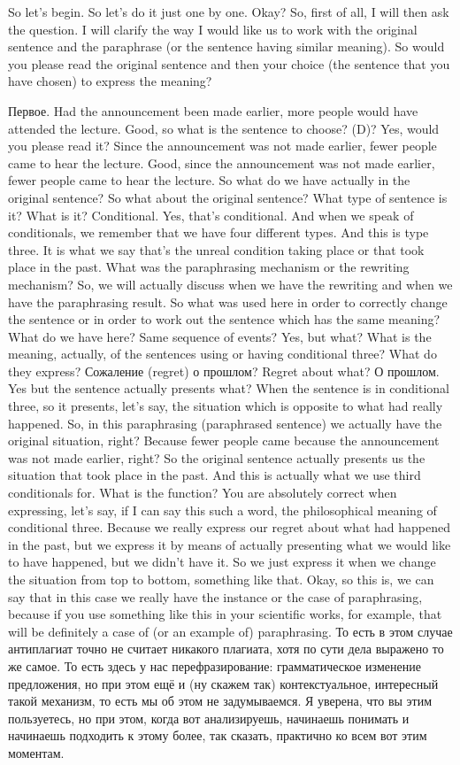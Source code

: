 \documentclass[main.tex]{subfiles}
\begin{document}
So let's begin.
So let's do it just one by one.
Okay?
So, first of all, I will then ask the question.
I will clarify the way I would like us to work with the original sentence and the paraphrase (or the sentence having similar meaning).
So would you please read the original sentence and then your choice (the sentence that you have chosen) to express the meaning?

Первое. Had the announcement been made earlier, more people would have attended the lecture.
Good, so what is the sentence to choose?
(D)?
Yes, would you please read it?
Since the announcement was not made earlier, fewer people came to hear the lecture.
Good, since the announcement was not made earlier, fewer people came to hear the lecture.
So what do we have actually in the original sentence?
So what about the original sentence?
What type of sentence is it?
What is it?
Conditional.
Yes, that's conditional.
And when we speak of conditionals, we remember that we have four different types.
And this is type three.
It is what we say that's the unreal condition taking place or that took place in the past.
What was the paraphrasing mechanism or the rewriting mechanism?
So, we will actually discuss when we have the rewriting and when we have the paraphrasing result.
So what was used here in order to correctly change the sentence or in order to work out the sentence which has the same meaning?
What do we have here?
Same sequence of events?
Yes, but what?
What is the meaning, actually, of the sentences using or having conditional three?
What do they express?
Сожаление (regret) о прошлом?
Regret about what?
О прошлом.
Yes but the sentence actually presents what?
When the sentence is in conditional three, so it presents, let's say, the situation which is opposite to what had really happened.
So, in this paraphrasing (paraphrased sentence) we actually have the original situation, right?
Because fewer people came because the announcement was not made earlier, right?
So the original sentence actually presents us the situation that took place in the past.
And this is actually what we use third conditionals for.
What is the function?
You are absolutely correct when expressing, let's say, if I can say this such a word, the philosophical meaning of conditional three.
Because we really express our regret about what had happened in the past, but we express it by means of actually presenting what we would like to have happened, but we didn't have it.
So we just express it when we change the situation from top to bottom, something like that.
Okay, so this is, we can say that in this case we really have the instance or the case of paraphrasing, because if you use something like this in your scientific works, for example, that will be definitely a case of (or an example of) paraphrasing.
То есть в этом случае антиплагиат точно не считает никакого плагиата, хотя по сути дела выражено то же самое.
То есть здесь у нас перефразирование: грамматическое изменение предложения, но при этом ещё и (ну скажем так) контекстуальное, интересный такой механизм, то есть мы об этом не задумываемся.
Я уверена, что вы этим пользуетесь, но при этом, когда вот анализируешь, начинаешь понимать и начинаешь подходить к этому более, так сказать, практично ко всем вот этим моментам.
\end{document}
